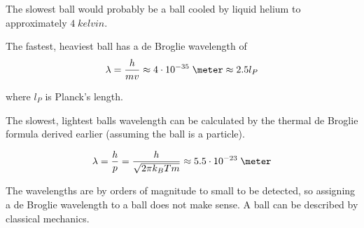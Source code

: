 \documentclass[a4paper,german,12pt,smallheadings]{scrartcl}
\begin{document}
\begin{enumerate}[a)]
    The slowest ball would probably be a ball cooled by liquid helium
    to approximately $4 \; kelvin$.

    The fastest, heaviest ball has a de Broglie wavelength of
    \begin{equation*}
      \lambda = \frac{h}{mv} \approx 4 \cdot 10^{-35} \; \meter \approx 2.5 l_P
    \end{equation*}

    where $l_P$ is Planck's length.

    The slowest, lightest balls wavelength can be calculated by the thermal de
    Broglie formula derived earlier (assuming the ball is a particle).

    \begin{equation*}
      \lambda = \frac{h}{p} = \frac{h}{\sqrt{2 \pi k_B T m}} \approx 5.5 \cdot 10^{-23} \; \meter
    \end{equation*}

    The wavelengths are by orders of magnitude to small to be detected, so
    assigning a de Broglie wavelength to a ball does not make sense. A ball can
    be described by classical mechanics.
\end{enumerate}
\end{document}
